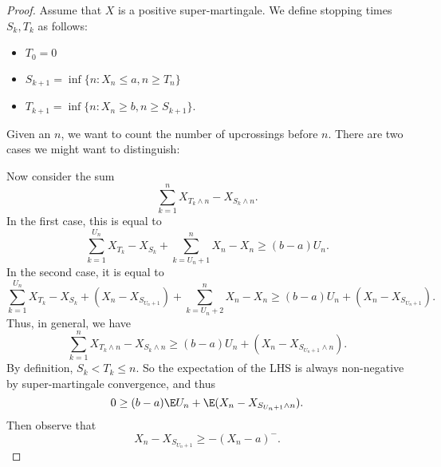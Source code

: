 \documentclass[a4paper]{article}
\begin{document}
\begin{proof}
  Assume that $X$ is a positive super-martingale. We define stopping times $S_k, T_k$ as follows:
  \begin{itemize}
    \item $T_0 = 0$
    \item $S_{k + 1} = \inf\{n: X_n \leq a, n \geq T_n\}$
    \item $T_{k + 1} = \inf\{n: X_n \geq b, n \geq S_{k + 1}\}$.
  \end{itemize}
  Given an $n$, we want to count the number of upcrossings before $n$. There are two cases we might want to distinguish:
  \begin{center}
  \end{center}
  Now consider the sum
  \[
    \sum_{k = 1}^n X_{T_k \wedge n} - X_{S_k \wedge n}.
  \]
  In the first case, this is equal to
  \[
    \sum_{k = 1}^{U_n} X_{T_k} - X_{S_k} + \sum_{k = U_n + 1}^n X_n - X_n \geq (b - a) U_n.
  \]
  In the second case, it is equal to
  \[
    \sum_{k = 1}^{U_n} X_{T_k} - X_{S_k} + (X_n - X_{S_{U_n + 1}}) + \sum_{k = U_n + 2}^n X_n - X_n \geq (b - a) U_n + (X_n - X_{S_{U_n + 1}}).
  \]
  Thus, in general, we have
  \[
    \sum_{k = 1}^n X_{T_k \wedge n} - X_{S_k \wedge n} \geq (b - a) U_n + (X_n - X_{S_{U_n + 1} \wedge n}).
  \]
  By definition, $S_k < T_k \leq n$. So the expectation of the LHS is always non-negative by super-martingale convergence, and thus
  \[
    0 \geq (b - a) \E U_n + \E(X_n - X_{S_{U_n + 1} \wedge n}).
  \]
  Then observe that
  \[
    X_n- X_{S_{U_n + 1}} \geq - (X_n - a)^-.
  \]
\end{proof}
%
\end{document}
